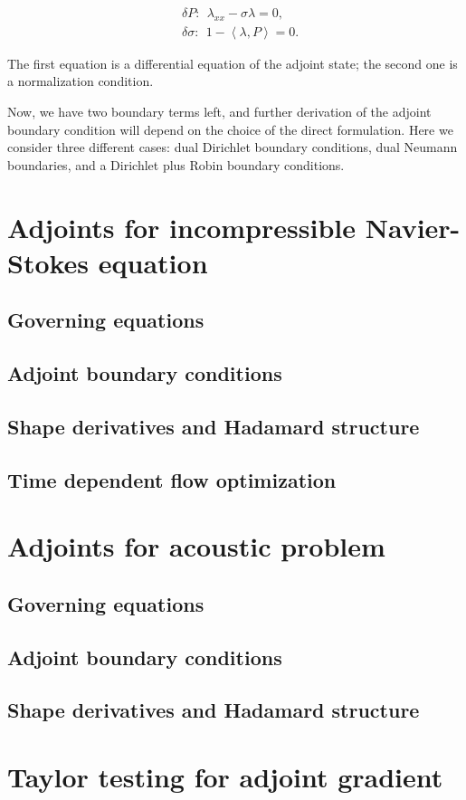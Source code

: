 \begin{subequations}
\begin{align}
    & \delta P: \ \  \lambda_{xx} - \sigma \lambda = 0, \\
    & \delta \sigma: \ \ 1 - \left<\lambda, P \right> = 0.
\end{align}
\end{subequations}

The first equation is a differential equation of the adjoint state; the second one is a normalization condition.

Now, we have two boundary terms left, and further derivation of the adjoint boundary condition will depend on the choice of the direct formulation. Here we consider three different cases: dual Dirichlet boundary conditions, dual Neumann boundaries, and a Dirichlet plus Robin boundary conditions.

\clearpage

\section{Adjoints for incompressible Navier-Stokes equation}
\subsection{Governing equations}
\subsection{Adjoint boundary conditions}
\subsection{Shape derivatives and Hadamard structure}
\subsection{Time dependent flow optimization}

\section{Adjoints for acoustic problem}
\subsection{Governing equations}
\subsection{Adjoint boundary conditions}
\subsection{Shape derivatives and Hadamard structure}

\section{Taylor testing for adjoint gradient}
